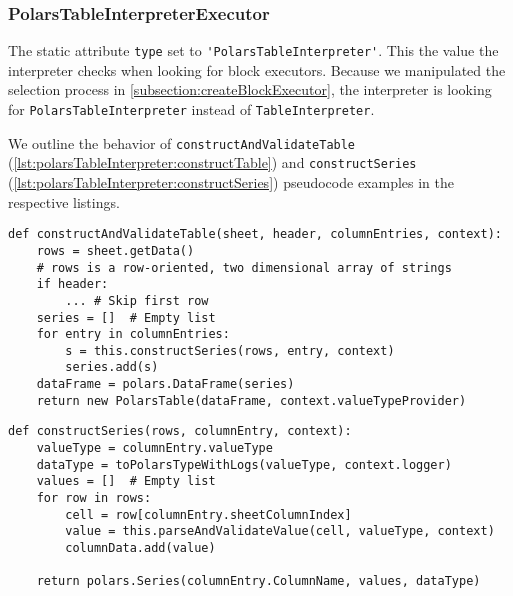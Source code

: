 \subsubsection{PolarsTableInterpreterExecutor}
\label{subsubsection:polarstableinterpreterexecutor}
The static attribute \Verb|type| set to \Verb|'PolarsTableInterpreter'|.
This the value the interpreter checks when looking for block executors.
Because we manipulated the selection process in \ref{subsection:createBlockExecutor}, the interpreter is looking for \Verb|PolarsTableInterpreter| instead of \Verb|TableInterpreter|.

We outline the behavior of \Verb|constructAndValidateTable| (\ref{lst:polarsTableInterpreter:constructTable}) and \Verb|constructSeries| (\ref{lst:polarsTableInterpreter:constructSeries}) pseudocode examples in the respective listings.
\begin{listing}
	\begin{verbatim}
def constructAndValidateTable(sheet, header, columnEntries, context):
	rows = sheet.getData()
	# rows is a row-oriented, two dimensional array of strings
	if header:
		... # Skip first row
	series = []  # Empty list
	for entry in columnEntries:
		s = this.constructSeries(rows, entry, context)
		series.add(s)
	dataFrame = polars.DataFrame(series)
	return new PolarsTable(dataFrame, context.valueTypeProvider)
	\end{verbatim}
	\caption{}
	\label{lst:polarsTableInterpreter:constructTable}
\end{listing}
\begin{listing}
	\begin{verbatim}
def constructSeries(rows, columnEntry, context):
	valueType = columnEntry.valueType
	dataType = toPolarsTypeWithLogs(valueType, context.logger)
	values = []  # Empty list
	for row in rows:
		cell = row[columnEntry.sheetColumnIndex]
		value = this.parseAndValidateValue(cell, valueType, context)
		columnData.add(value)

	return polars.Series(columnEntry.ColumnName, values, dataType)
	\end{verbatim}
	\caption{}
	\label{lst:polarsTableInterpreter:constructSeries}
\end{listing}


